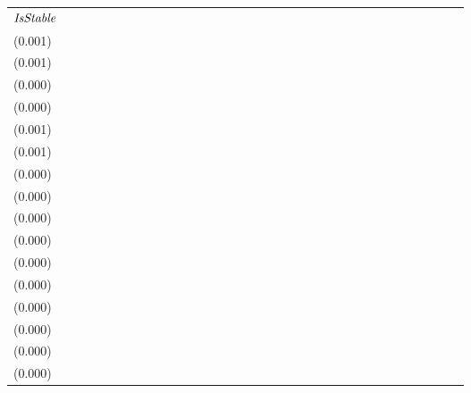 \begin{tabular}{lllllllllllllllllllllllllllllllll}
${\it IsStable}$             &   \makecell{$0.056^{**}$ \\(0.001)} &   \makecell{$0.055^{**}$ \\(0.001)} &                                     &                                     &   \makecell{$0.003^{**}$ \\(0.000)} &   \makecell{$0.003^{**}$ \\(0.000)} &                                     &                                     &  \makecell{$-0.024^{**}$ \\(0.001)} &  \makecell{$-0.024^{**}$ \\(0.001)} &                                     &                                     &  \makecell{$-0.001^{**}$ \\(0.000)} &  \makecell{$-0.001^{**}$ \\(0.000)} &                                     &                                     &  \makecell{$-0.038^{**}$ \\(0.000)} &  \makecell{$-0.038^{**}$ \\(0.000)} &                                     &                                     &  \makecell{$-0.001^{**}$ \\(0.000)} &  \makecell{$-0.001^{**}$ \\(0.000)} &                                     &                                     &   \makecell{$0.009^{**}$ \\(0.000)} &   \makecell{$0.009^{**}$ \\(0.000)} &                                     &                                    &  \makecell{$0.000^{**}$ \\(0.000)} &  \makecell{$0.000^{**}$ \\(0.000)} &                                    &                                    \\

\end{tabular}
